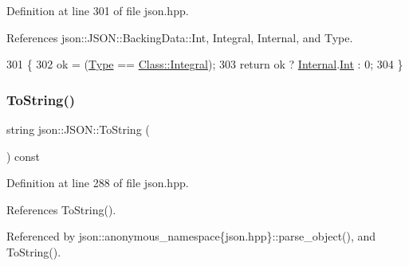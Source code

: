 Definition at line 301 of file json.\+hpp.



References json\+::\+J\+S\+O\+N\+::\+Backing\+Data\+::\+Int, Integral, Internal, and Type.


\begin{DoxyCode}
301                                      \{
302             ok = (\mbox{\hyperlink{classjson_1_1_j_s_o_n_a3fa6923afa41bdfe38077fbc0079aaf5}{Type}} == \mbox{\hyperlink{classjson_1_1_j_s_o_n_a762f55df6d407c1af61607ed516ffe07a4ea94552a2bec56a29592359a1b6069e}{Class::Integral}});
303             \textcolor{keywordflow}{return} ok ? \mbox{\hyperlink{classjson_1_1_j_s_o_n_a1e2a064794c3d55c8bb8887fc5734947}{Internal}}.\mbox{\hyperlink{unionjson_1_1_j_s_o_n_1_1_backing_data_a0d80815a70ff5bb9345f75de79ec81c3}{Int}} : 0;
304         \}
\end{DoxyCode}
\mbox{\label{classjson_1_1_j_s_o_n_a5f1c7695d59c4652f01cb087eff954f5}} 
\subsubsection{\texorpdfstring{To\+String()}{ToString()}\hspace{0.1cm}{\footnotesize\ttfamily [1/2]}}
{\footnotesize\ttfamily string json\+::\+J\+S\+O\+N\+::\+To\+String (\begin{DoxyParamCaption}{ }\end{DoxyParamCaption}) const\hspace{0.3cm}{\ttfamily [inline]}}



Definition at line 288 of file json.\+hpp.



References To\+String().



Referenced by json\+::anonymous\+\_\+namespace\{json.\+hpp\}\+::parse\+\_\+object(), and To\+String().


